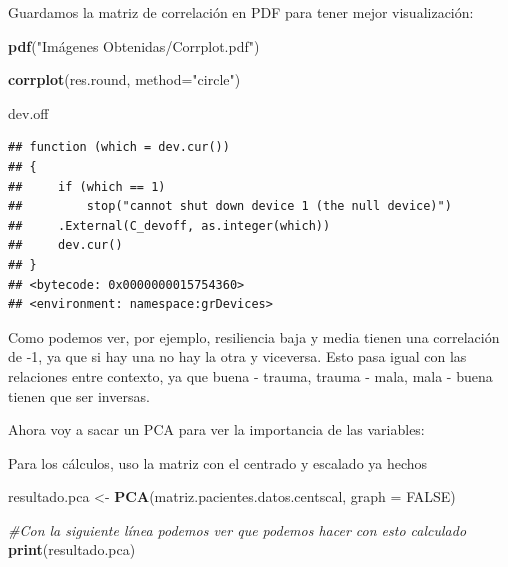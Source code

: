 \documentclass[]{article}
\newenvironment{Shaded}{\begin{snugshade}}{\end{snugshade}}
\newcommand{\KeywordTok}[1]{\textcolor[rgb]{0.13,0.29,0.53}{\textbf{#1}}}
\newcommand{\DataTypeTok}[1]{\textcolor[rgb]{0.13,0.29,0.53}{#1}}
\newcommand{\StringTok}[1]{\textcolor[rgb]{0.31,0.60,0.02}{#1}}
\newcommand{\CommentTok}[1]{\textcolor[rgb]{0.56,0.35,0.01}{\textit{#1}}}
\newcommand{\OtherTok}[1]{\textcolor[rgb]{0.56,0.35,0.01}{#1}}
\newcommand{\NormalTok}[1]{#1}
\begin{document}
Guardamos la matriz de correlación en PDF para tener mejor
visualización:

\begin{Shaded}
\begin{Highlighting}[]
\KeywordTok{pdf}\NormalTok{(}\StringTok{"Imágenes Obtenidas/Corrplot.pdf"}\NormalTok{)}

\KeywordTok{corrplot}\NormalTok{(res.round, }\DataTypeTok{method=}\StringTok{"circle"}\NormalTok{)}

\NormalTok{dev.off}
\end{Highlighting}
\end{Shaded}

\begin{verbatim}
## function (which = dev.cur()) 
## {
##     if (which == 1) 
##         stop("cannot shut down device 1 (the null device)")
##     .External(C_devoff, as.integer(which))
##     dev.cur()
## }
## <bytecode: 0x0000000015754360>
## <environment: namespace:grDevices>
\end{verbatim}

Como podemos ver, por ejemplo, resiliencia baja y media tienen una
correlación de -1, ya que si hay una no hay la otra y viceversa. Esto
pasa igual con las relaciones entre contexto, ya que buena - trauma,
trauma - mala, mala - buena tienen que ser inversas.

Ahora voy a sacar un PCA para ver la importancia de las variables:

Para los cálculos, uso la matriz con el centrado y escalado ya hechos

\begin{Shaded}
\begin{Highlighting}[]
\NormalTok{resultado.pca <-}\StringTok{ }\KeywordTok{PCA}\NormalTok{(matriz.pacientes.datos.centscal, }\DataTypeTok{graph =} \OtherTok{FALSE}\NormalTok{)}

\CommentTok{#Con la siguiente línea podemos ver que podemos hacer con esto calculado}
\KeywordTok{print}\NormalTok{(resultado.pca)}
\end{Highlighting}
\end{Shaded}
\end{document}
